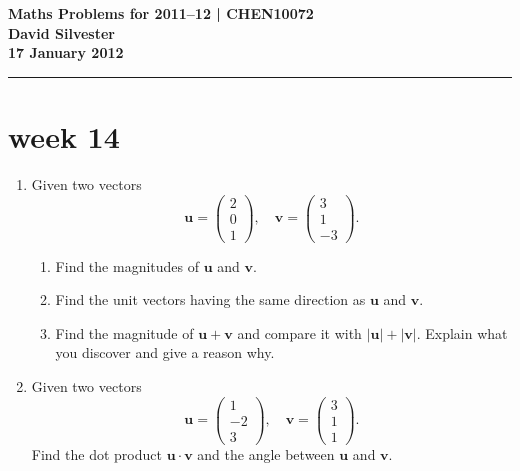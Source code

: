 \documentclass[11pt,a4paper]{article}
\begin{document}
\begin{center} 
{\bf Maths Problems for 2011--12 | CHEN10072 \\
David Silvester \\
17 January 2012}
\end{center}

\hrule
\smallskip
\section*{week 14}



\begin{enumerate}

\item\label{qdjs1v}
Given two vectors
 $$\mathbf{u}= \left ( \begin{array}{r} 2\\ 0 \\ 1 \end{array} \right ) , \quad
  \mathbf{v}=  \left ( \begin{array}{r} 3\\ 1 \\ -3 \end{array} \right ).$$  
 \begin{enumerate}
\item Find the magnitudes of $\mathbf{u}$ and $\mathbf{v}$. 
\item Find the unit vectors having the same direction as $\mathbf{u}$ and $\mathbf{v}$.
\item Find the magnitude of $\mathbf{u}+ \mathbf{v}$ and compare it with
$|\mathbf{u}| + |\mathbf{v}|$.  Explain what you discover and give a reason why.
\end{enumerate}
%
	
\item\label{qdjs2v}
Given two vectors
 $$\mathbf{u}= \left ( \begin{array}{r} 1\\ -2 \\ 3 \end{array} \right ) , \quad
      \mathbf{v}=  \left ( \begin{array}{r} 3\\ 1 \\ 1\end{array} \right ).$$  
Find the dot product $\mathbf{u}\cdot \mathbf{v}$ and the angle
between  $\mathbf{u}$ and  $\mathbf{v}$. 
%





\end{enumerate}
\end{document}
